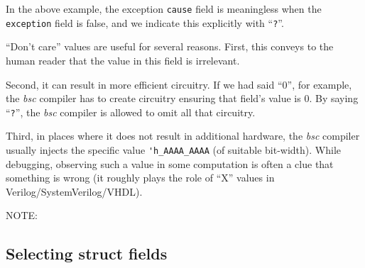 In the above example, the exception \verb|cause| field is meaningless
when the \verb|exception| field is false, and we indicate this
explicitly with ``\verb|?|''.

``Don't care'' values are useful for several reasons.  First, this
conveys to the human reader that the value in this field is
irrelevant.

Second, it can result in more efficient circuitry.  If we had said
``0'', for example, the \emph{bsc} compiler has to create circuitry
ensuring that field's value is 0. By saying ``\verb|?|'', the
\emph{bsc} compiler is allowed to omit all that circuitry.

Third, in places where it does not result in additional hardware, the
\emph{bsc} compiler usually injects the specific value
\verb|'h_AAAA_AAAA| (of suitable bit-width).  While debugging,
observing such a value in some computation is often a clue that
something is wrong (it roughly plays the role of ``X'' values in
Verilog/SystemVerilog/VHDL).


\vspace{2ex}

NOTE:


\subsection{Selecting struct fields}


